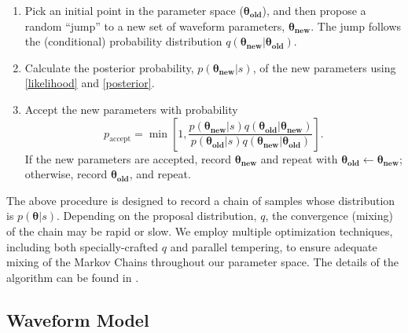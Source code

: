 \documentclass{emulateapj}
\begin{document}
\begin{enumerate}
\item Pick an initial point in the parameter space
  ($\boldsymbol{\theta_{\text{old}}}$), and then propose a random
  ``jump'' to a new set of waveform parameters,
  $\boldsymbol{\theta_{\text{new}}}$.  The jump follows the
  (conditional) probability distribution $q\left(
  \boldsymbol{\theta_{\text{new}}} | \boldsymbol{\theta_{\text{old}}}
  \right)$.
\item Calculate the posterior probability,
  $p(\boldsymbol{\theta_{\text{new}}}|s)$, of the new parameters using
  \eqref{likelihood} and \eqref{posterior}.
\item Accept the new parameters with probability 
  \begin{equation}
    p_\mathrm{accept} = \min \left[ 1, \frac{p(\boldsymbol{\theta_{\text{new}}}|s) q\left(\boldsymbol{\theta_{\text{old}}} | \boldsymbol{\theta_{\text{new}}} \right)}{p(\boldsymbol{\theta_{\text{old}}}|s) q\left(\boldsymbol{\theta_{\text{new}}} | \boldsymbol{\theta_{\text{old}}} \right)} \right].
  \end{equation}
  If the new parameters are accepted, record
  $\boldsymbol{\theta_\text{new}}$ and repeat with
  $\boldsymbol{\theta_\text{old}} \gets
  \boldsymbol{\theta_\text{new}}$; otherwise, record
  $\boldsymbol{\theta_\text{old}}$, and repeat.
\end{enumerate} 
  
The above procedure is designed to record a chain of samples whose
distribution is $p\left(\boldsymbol{\theta}|s\right)$.  Depending on
the proposal distribution, $q$, the convergence (mixing) of the chain
may be rapid or slow.  We employ multiple optimization techniques,
including both specially-crafted $q$ and parallel tempering, to ensure
adequate mixing of the Markov Chains throughout our parameter space.
The details of the algorithm can be found in
\citep{Sluys08,spinspiral2009, spinspiral2010}.
  
 
\subsection{Waveform Model}
\label{waveformSection}
  
\end{document}
